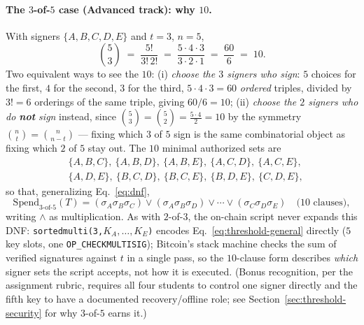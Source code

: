 \documentclass[11pt,a4paper]{article}
\theoremstyle{plain}
\theoremstyle{definition}
\begin{document}
\paragraph{The $3$-of-$5$ case (Advanced track): why $10$.} With signers
$\{A,B,C,D,E\}$ and $t=3$, $n=5$,
\begin{equation}
    \binom{5}{3} \;=\; \frac{5!}{3!\,2!} \;=\; \frac{5\cdot4\cdot3}{3\cdot2\cdot1} \;=\; \frac{60}{6} \;=\; 10.
\end{equation}
Two equivalent ways to see the $10$: (i) \emph{choose the $3$ signers who
sign}: $5$ choices for the first, $4$ for the second, $3$ for the third,
$5\cdot4\cdot3=60$ \emph{ordered} triples, divided by $3!=6$ orderings of the
same triple, giving $60/6=10$; (ii) \emph{choose the $2$ signers who do
\textbf{not} sign} instead, since $\binom{5}{3}=\binom{5}{2}=\frac{5\cdot4}{2}=10$
by the symmetry $\binom{n}{t}=\binom{n}{n-t}$ --- fixing which $3$ of $5$ sign
is the same combinatorial object as fixing which $2$ of $5$ stay out. The $10$
minimal authorized sets are
\begin{equation}
\begin{aligned}
    &\{A,B,C\},\ \{A,B,D\},\ \{A,B,E\},\ \{A,C,D\},\ \{A,C,E\},\\
    &\{A,D,E\},\ \{B,C,D\},\ \{B,C,E\},\ \{B,D,E\},\ \{C,D,E\},
\end{aligned}
\end{equation}
so that, generalizing Eq.~\eqref{eq:dnf},
\begin{equation}
    \mathrm{Spend}_{3\text{-of-}5}(T)=
    (\sigma_A\sigma_B\sigma_C)\vee(\sigma_A\sigma_B\sigma_D)\vee\cdots\vee(\sigma_C\sigma_D\sigma_E)
    \quad\text{(10 clauses)},
\end{equation}
writing $\wedge$ as multiplication. As with $2$-of-$3$, the on-chain script
never expands this DNF: \texttt{sortedmulti(3,$K_A,\dots,K_E$)} encodes
Eq.~\eqref{eq:threshold-general} directly ($5$ key slots, one
\texttt{OP\_CHECKMULTISIG}); Bitcoin's stack machine checks the sum of
verified signatures against $t$ in a single pass, so the $10$-clause form
describes \emph{which} signer sets the script accepts, not how it is executed.
(Bonus recognition, per the assignment rubric, requires all four students to
control one signer directly and the fifth key to have a documented
recovery/offline role; see Section~\ref{sec:threshold-security} for why
$3$-of-$5$ earns it.)
\end{document}
